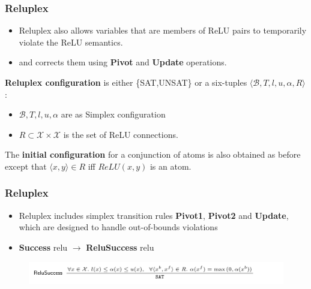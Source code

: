 \documentclass[aspectratio=169%
,serif,mathserif]{beamer}
\begin{document}
\begin{frame}
	\frametitle{Reluplex}

	\begin{itemize}
		\item Reluplex also allows variables that are members of ReLU pairs to temporarily violate the ReLU semantics.
		\item and corrects them using \textbf{Pivot} and \textbf{Update} operations.
	\end{itemize}
	\begin{definition}
		\textbf{Reluplex configuration} is either \{SAT,UNSAT\} or a six-tuples $\langle\mathcal{B}, T, l, u,\alpha, R \rangle$:
		\begin{itemize}
			\item $\mathcal{B}, T, l, u,\alpha$ are as Simplex configuration
			\item $R \subset \mathcal{X} \times \mathcal{X}$ is the set of ReLU connections.
		\end{itemize}
	\end{definition}
	The \textbf{initial configuration} for a conjunction of atoms is also obtained as before except that $\langle x,y \rangle \in R$ iff $ReLU(x, y)$ is an atom.
\end{frame}

\begin{frame}
	\frametitle{Reluplex}
	\begin{itemize}
		\item Reluplex includes simplex transition rules \textbf{Pivot1}, \textbf{Pivot2} and \textbf{Update}, which are
		designed to handle out-of-bounds violations
		\item \textbf{Success} relu $\to$ \textbf{ReluSuccess} relu		
	\end{itemize}
	\begin{figure}[htbp]
		\includegraphics[width=1\linewidth]{5.png}
	\end{figure}
	
\end{frame}
\end{document}
